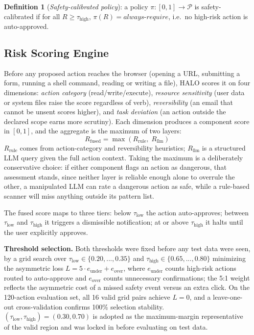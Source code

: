 \documentclass[a4paper, 11pt]{article}
\begin{document}
\textbf{Definition 1} (\textit{Safety-calibrated policy}): a policy
$\pi: [0,1] \to \mathcal{P}$ is safety-calibrated if for all
$R \geq \tau_{\text{high}}$, $\pi(R) = \textit{always-require}$, i.e.\ no
high-risk action is auto-approved.

\subsection{Risk Scoring Engine}

Before any proposed action reaches the browser (opening a URL, submitting a
form, running a shell command, reading or writing a file), HALO scores it on
four dimensions: \textit{action category} (read/write/execute), \textit{resource
sensitivity} (user data or system files raise the score regardless of verb),
\textit{reversibility} (an email that cannot be unsent scores higher), and
\textit{task deviation} (an action outside the declared scope earns more
scrutiny). Each dimension produces a component score in $[0,1]$, and the
aggregate is the maximum of two layers:
\begin{equation}
  R_{\text{fused}} = \max\!\left(R_{\text{rule}},\; R_{\text{llm}}\right)
  \label{eq:risk-fusion}
\end{equation}
$R_{\text{rule}}$ comes from action-category and reversibility heuristics;
$R_{\text{llm}}$ is a structured LLM query given the full action context. Taking
the maximum is a deliberately conservative choice: if either component flags an
action as dangerous, that assessment stands, since neither layer is reliable
enough alone to overrule the other, a manipulated LLM can rate a dangerous action
as safe, while a rule-based scanner will miss anything outside its pattern list.

The fused score maps to three tiers: below $\tau_{\text{low}}$ the action
auto-approves; between $\tau_{\text{low}}$ and $\tau_{\text{high}}$ it triggers a
dismissible notification; at or above $\tau_{\text{high}}$ it halts until the
user explicitly approves.

\textbf{Threshold selection.} Both thresholds were fixed before any test data
were seen, by a grid search over $\tau_{\text{low}} \in \{0.20,...,0.35\}$ and
$\tau_{\text{high}} \in \{0.65,...,0.80\}$ minimizing the asymmetric loss
$L = 5 \cdot e_{\text{under}} + e_{\text{over}}$, where $e_{\text{under}}$ counts
high-risk actions routed to auto-approve and $e_{\text{over}}$ counts unnecessary
confirmations; the 5:1 weight reflects the asymmetric cost of a missed safety
event versus an extra click. On the 120-action evaluation set, all 16 valid grid
pairs achieve $L=0$, and a leave-one-out cross-validation confirms 100\%
selection stability. $(\tau_{\text{low}}, \tau_{\text{high}}) = (0.30, 0.70)$ is
adopted as the maximum-margin representative of the valid region and was locked
in before evaluating on test data.
\end{document}
